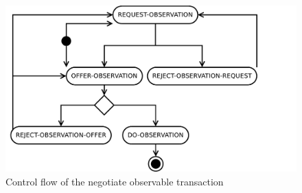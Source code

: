 \begin{figure}[htbp]
	\centering
		\includegraphics[width=1.00\textwidth]{trans3-control.pdf}
	\caption{Control flow of the negotiate observable transaction}
	\label{fig:trans3-control}
\end{figure}





